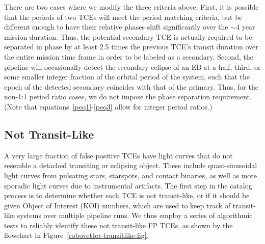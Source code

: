 There are two cases where we modify the three criteria above. First, it is possible that the periods of two TCEs will meet the period matching criteria, but be different enough to have their relative phases shift significantly over the $\sim$4 year mission duration. Thus, the potential secondary TCE is actually required to be separated in phase by at least 2.5 times the previous TCE's transit duration over the entire mission time frame in order to be labeled as a secondary. Second, the \kepler{} pipeline will occasionally detect the secondary eclipse of an EB at a half, third, or some smaller integer fraction of the orbital period of the system, such that the epoch of the detected secondary coincides with that of the primary. Thus, for the non-1:1 period ratio cases, we do not impose the phase separation requirement. (Note that equations~\ref{peq1}-\ref{peq3} allow for integer period ratios.)



\subsection{Not Transit-Like}
\label{nottransitlikesec}

A very large fraction of false positive TCEs have light curves that do not resemble a detached transiting or eclipsing object. These include quasi-sinusoidal light curves from pulsating stars, starspots, and contact binaries, as well as more sporadic light curves due to instrumental artifacts. The first step in the catalog process is to determine whether each TCE is not transit-like, or if it should be given \kepler{} Object of Interest (KOI) numbers, which are used to keep track of transit-like systems over multiple \kepler{} pipeline runs. We thus employ a series of algorithmic tests to reliably identify these not transit-like FP TCEs, as shown by the flowchart in Figure~\ref{robovetter-transitlike-fig}.


